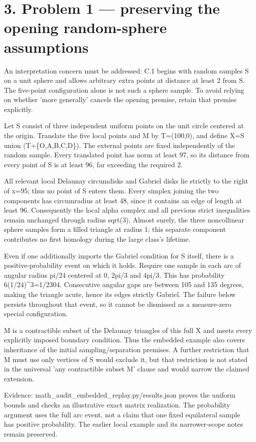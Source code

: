 \documentclass[10pt]{article}
\begin{document}
\section*{3. Problem 1 — preserving the opening random-sphere assumptions}
An interpretation concern must be addressed: C.1 begins with random samples S on a unit sphere and allows arbitrary extra points at distance at least 2 from S. The five-point configuration alone is not such a sphere sample. To avoid relying on whether ’more generally’ cancels the opening premise, retain that premise explicitly.\par
Let S consist of three independent uniform points on the unit circle centered at the origin. Translate the five local points and M by T=(100,0), and define X=S union (T+\{O,A,B,C,D\}). The external points are fixed independently of the random sample. Every translated point has norm at least 97, so its distance from every point of S is at least 96, far exceeding the required 2.\par
All relevant local Delaunay circumdisks and Gabriel disks lie strictly to the right of x=95; thus no point of S enters them. Every simplex joining the two components has circumradius at least 48, since it contains an edge of length at least 96. Consequently the local alpha complex and all previous strict inequalities remain unchanged through radius sqrt(3). Almost surely, the three noncollinear sphere samples form a filled triangle at radius 1; this separate component contributes no first homology during the large class’s lifetime.\par
Even if one additionally imports the Gabriel condition for S itself, there is a positive-probability event on which it holds. Require one sample in each arc of angular radius pi/24 centered at 0, 2pi/3 and 4pi/3. This has probability 6(1/24)\textasciicircum{}3=1/2304. Consecutive angular gaps are between 105 and 135 degrees, making the triangle acute, hence its edges strictly Gabriel. The failure below persists throughout that event, so it cannot be dismissed as a measure-zero special configuration.\par
M is a contractible subset of the Delaunay triangles of this full X and meets every explicitly imposed boundary condition. Thus the embedded example also covers inheritance of the initial sampling/separation premises. A further restriction that M must use only vertices of S would exclude it, but that restriction is not stated in the universal ’any contractible subset M’ clause and would narrow the claimed extension.\par
Evidence: math\_audit\_embedded\_replay.py/results.json proves the uniform bounds and checks an illustrative exact matrix realization. The probability argument uses the full arc event, not a claim that one fixed equilateral sample has positive probability. The earlier local example and its narrower-scope notes remain preserved.\par
\end{document}
